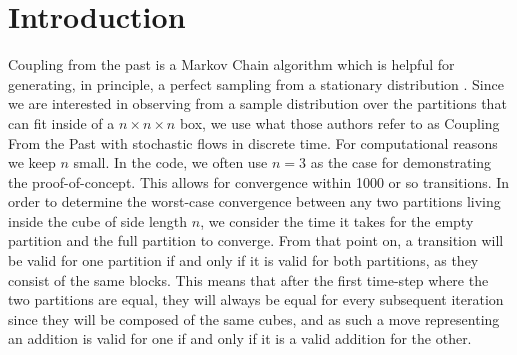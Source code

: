 


%

\section{Introduction}

Coupling from the past is a Markov Chain algorithm which is helpful for generating, in principle, a perfect sampling from a stationary distribution \cite{propp1997coupling}. Since we are interested in observing from a sample distribution over the partitions that can fit inside of a $n\times n\times n$ box, we use what those authors refer to as Coupling From the Past with stochastic flows in discrete time. For computational reasons we keep $n$ small. In the code, we often use $n=3$ as the case for demonstrating the proof-of-concept. This allows for convergence within 1000 or so transitions. In order to determine the worst-case convergence between any two partitions living inside the cube of side length $n$, we consider the time it takes for the empty partition and the full partition to converge. From that point on, a transition will be valid for one partition if and only if it is valid for both partitions, as they consist of the same blocks. This means that after the first time-step where the two partitions are equal, they will always be equal for every subsequent iteration since they will be composed of the same cubes, and as such a move representing an addition is valid for one if and only if it is a valid addition for the other.

